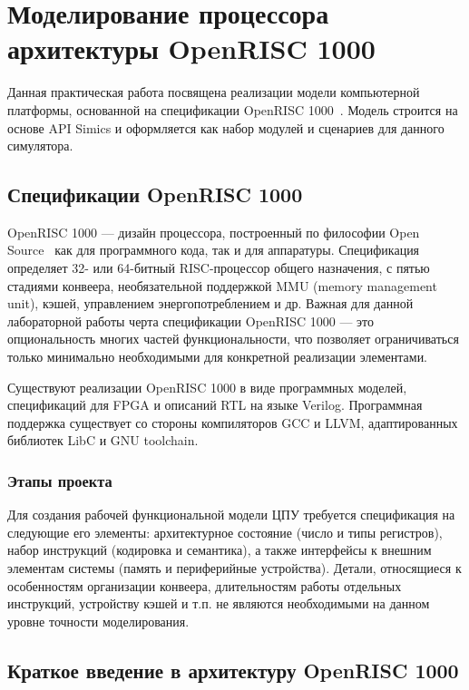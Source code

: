 \chapter{Моделирование процессора архитектуры OpenRISC 1000}\label{chap:lab06}

Данная практическая работа посвящена реализации модели компьютерной платформы, основанной на спецификации OpenRISC 1000~\cite{or1k-spec}. Модель строится на основе API Simics и оформляется как набор модулей и сценариев для данного симулятора.

\section{Спецификации OpenRISC 1000}

OpenRISC 1000 --- дизайн процессора, построенный по философии Open Source~\cite{open-source-definition-ru} как для программного кода, так и для аппаратуры. Спецификация определяет 32- или 64-битный RISC-процессор общего назначения, с пятью стадиями конвеера, необязательной поддержкой MMU (\abbr memory management unit), кэшей, управлением энергопотреблением и др. Важная для данной лабораторной работы черта спецификации OpenRISC 1000 --- это опциональность многих частей функциональности, что позволяет ограничиваться только минимально необходимыми для конкретной реализации элементами.

Существуют реализации OpenRISC 1000 в виде программных моделей, спецификаций для FPGA и описаний RTL на языке Verilog. Программная поддержка существует со стороны компиляторов GCC и LLVM, адаптированных библиотек LibC и GNU toolchain.

\subsection{Этапы проекта}

Для создания рабочей функциональной модели ЦПУ требуется спецификация на следующие его элементы: архитектурное состояние (число и типы регистров), набор инструкций (кодировка и семантика), а также интерфейсы к внешним элементам системы (память и периферийные устройства). Детали, относящиеся к особенностям организации конвеера, длительностям работы отдельных инструкций, устройству кэшей и т.п. не являются необходимыми на данном уровне точности моделирования.

\section{Краткое введение в архитектуру OpenRISC 1000}

